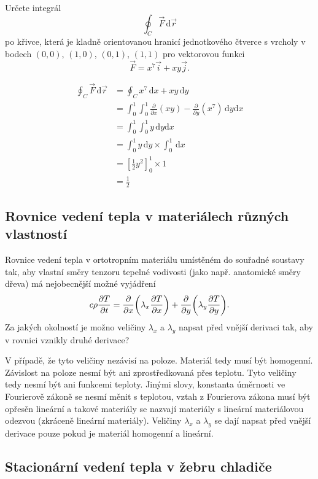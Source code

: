 Určete integrál $$\oint_C \vec F\,\mathrm d\vec r$$ po křivce, která je kladně orientovanou hranicí jednotkového čtverce s vrcholy v bodech $(0,0)$, $(1,0)$, $(0,1)$, $(1,1)$ pro vektorovou funkci $$\vec F=x^7\vec i+xy\vec j.$$

\reseni

$$
\begin{aligned}
  \oint_C \vec F\,\mathrm d\vec r
  &=
  \oint_C x^7\,\mathrm dx+ xy\,\mathrm dy\\&
  =\int_0^1 \int_0^1 \frac{\partial}{\partial x}(xy)-\frac{\partial}{\partial y}(x^7) \,\mathrm dy\mathrm dx\\
  &=\int_0^1 \int_0^1 y \,\mathrm dy\mathrm dx\\&
  =\int_0^1 y \,\mathrm dy \times \int_0^1 \,\mathrm dx \\&= \left[\frac 12 y^2\right]_0^1 \times 1\\&= \frac 12
\end{aligned}
$$

\konec

\subsection{Rovnice vedení tepla v materiálech různých vlastností}

Rovnice vedení tepla v ortotropním materiálu umístěném do souřadné soustavy tak, aby vlastní směry tenzoru tepelné vodivosti (jako např. anatomické směry dřeva) má nejobecnější možné vyjádření
$$c\rho\pdv{T}{t}=\pdv{x}\qty(\lambda_x\pdv{T}{x} )+\pdv{y}\qty(\lambda_y\pdv{T}{y}) . $$
Za jakých okolností je možno veličiny $\lambda_x$ a $\lambda_y$ napsat před vnější derivaci tak, aby v rovnici vznikly druhé derivace? 


\reseni

V případě, že tyto veličiny nezávisí na poloze. Materiál tedy musí být homogenní. Závislost na poloze nesmí být ani zprostředkovaná přes teplotu. Tyto veličiny tedy nesmí být ani funkcemi teploty. Jinými slovy, konstanta úměrnosti ve Fourierově zákoně se nesmí měnit s teplotou, vztah z Fourierova zákona musí být opřesěn lineární a takové materiály se nazvají materiály s lineární materiálovou odezvou (zkráceně lineární materiály). Veličiny  $\lambda_x$ a $\lambda_y$  se dají napsat před vnější derivace pouze pokud je materiál homogenní a lineární.

\konec

\subsection{Stacionární vedení tepla v žebru chladiče}


